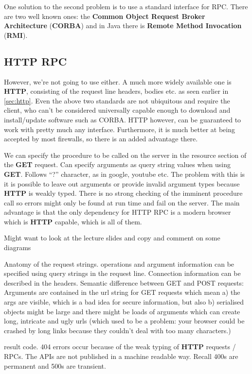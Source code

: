 \documentclass[11pt]{article}
\begin{document}
One solution to the second problem is to use a standard interface for RPC. There are two well known ones: the \textbf{Common Object Request Broker Architecture} (\textbf{CORBA}) and in Java there is \textbf{Remote Method Invocation} (\textbf{RMI}).

\subsection{HTTP RPC}
However, we’re not going to use either. A much more widely available one is \textbf{HTTP}, consisting of the request line headers, bodies etc. as seen earlier in \ref{sec:http}. Even the above two standards are not ubiquitous and require the client, who can’t be considered universally capable enough to download and install/update software such as CORBA. HTTP however, can be guaranteed to work with pretty much any interface. Furthermore, it is much better at being accepted by most firewalls, so there is an added advantage there.

We can specify the procedure to be called on the server in the resource section of the \textbf{GET} request.
Can specify arguments as query string values when using \textbf{GET}. Follows “?” character, as in google, youtube etc. The problem with this is it is possible to leave out arguments or provide invalid argument types because \textbf{HTTP} is weakly typed. There is no strong checking of the imminent procedure call so errors might only be found at run time and fail on the server. The main advantage is that the only dependency for HTTP RPC is a modern browser which is \textbf{HTTP} capable, which is all of them.


Might want to look at the lecture slides and copy and comment on some diagrams

Anatomy of the request strings.
operations and argument information can be specified using query strings in the request line.
Connection information can be described in the headers.
Semantic difference between GET and POST requests: Arguments are contained in the url string for GET requests which mean a) the args are visible, which is a bad idea for secure information, but also b) serialised objects might be large and there might be loads of arguments which can create long, intricate and ugly urls (which used to be a problem: your browser could be crashed by long links because they couldn't deal with too many characters.)

result code.
404 errors occur because of the weak typing of \textbf{HTTP} requests / RPCs. The APIs are not published in a machine readable way. Recall 400s are permanent and 500s are transient.
\end{document}
